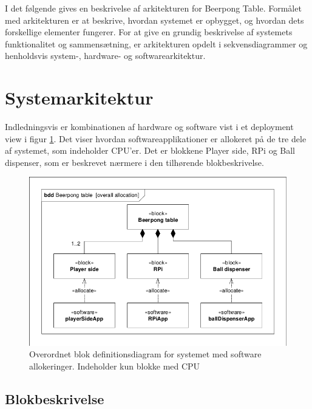 \documentclass[Arkitektur/System_main.tex]{subfiles}
\begin{document}
I det følgende gives en beskrivelse af arkitekturen for Beerpong Table. Formålet med arkitekturen er at beskrive, hvordan systemet er opbygget, og hvordan dets forskellige elementer fungerer. For at give en grundig beskrivelse af systemets funktionalitet og sammensætning, er arkitekturen opdelt i sekvensdiagrammer og henholdsvis system-, hardware- og softwarearkitektur.

\section{Systemarkitektur} \label{sec:systemarkitektur}

 Indledningsvis er kombinationen af hardware og software vist i et deployment view i figur \ref{fig:systemarkitektur}. Det viser hvordan softwareapplikationer er allokeret på de tre dele af systemet, som indeholder CPU'er. Det er blokkene Player side, RPi og Ball dispenser, som er beskrevet nærmere i den tilhørende blokbeskrivelse.


\begin{figure}[H]
    \centering
    \includegraphics[width=1\textwidth,trim={0.24in 0.24in 0.24in 0.24in},clip, page=1]{Arkitektur/graphics/BDD_og_IBD.pdf}
    \caption{Overordnet blok definitionsdiagram for systemet med software allokeringer. Indeholder kun blokke med CPU}
    \label{fig:systemarkitektur}
\end{figure}

\subsection{Blokbeskrivelse} \label{sec:system_block_description}
\end{document}
